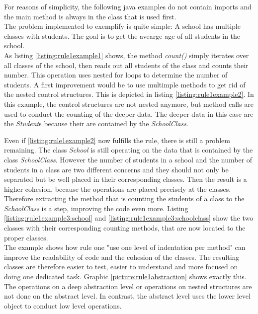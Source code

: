 For reasons of simplicity, the following java examples do not contain imports and the main method is always in the class that is used first. 
\\
The problem implemented to exemplify is quite simple: A school has multiple classes with students. The goal is to get the avearge age of all students in the school. 
\\

As listing \ref{listing:rule1example1} shows, the method \textit{count()} simply iterates over all classes of the school, then reads out all students of the class and counts their number. This operation uses nested for loops to determine the number of students. A first improvement would be to use multimple methods to get rid of the nested control structures. This is depicted in listing \ref{listing:rule1example2}. In this example, the control structures are not nested anymore, but method calls are used to conduct the counting of the deeper data. The deeper data in this case are the \textit{Student}s because their are contained by the \textit{SchoolClass}. 

Even if \ref{listing:rule1example2} now fulfills the rule, there is still a problem remaining. The class \textit{School} is still operating on the data that is contained by the class \textit{SchoolClass}. However the number of students in a school and the number of students in a class are two different concerns and they should not only be separated but be well placed in their corresponding classes. Then the result is a higher cohesion, because the operations are placed precisely at the classes. Therefore extracting the method that is counting the students of a class to the \textit{SchoolClass} is a step, improving the code even more. Listing \ref{listing:rule1example3:school} and \ref{listing:rule1example3:schoolclass} show the two classes with their corresponding counting methods, that are now located to the proper classes. 
\\

The example shows how rule one "use one level of indentation per method" can improve the readability of code and the cohesion of the classes. The resulting classes are therefore easier to test, easier to understand and more focused on doing one dedicated task. Graphic \ref{picture:rule1abstraction} shows exactly this. The operations on a deep abstraction level or operations on nested structures are not done on the abstract level. In contrast, the abstract level uses the lower level object to conduct low level operations. 

